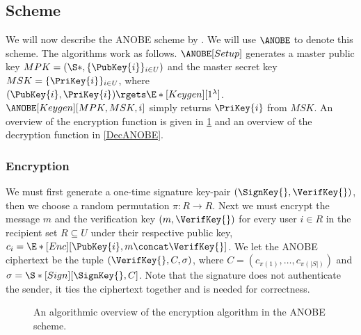 \subsection{ Scheme}\label{ANOBE}

We will now describe the \ac{ANOBE} scheme by \citet{ANOBE}.
We will use \(\ANOBE\) to denote this scheme.
The algorithms work as follows.
\(\ANOBE[Setup]\) generates a master public key \(MPK = (\S*, \{\PubKey{i}\}_{i\in
    U})\) and the master secret key \(MSK = \{\PriKey{i}\}_{i\in U}\), where 
\((\PubKey{i}, \PriKey{i})\rgets \E*[Keygen][1^\lambda]\).
\(\ANOBE[Keygen][MPK, MSK, i]\) simply returns \(\PriKey{i}\) from \(MSK\).
An overview of the encryption function is given in \cref{EncANOBE} and an 
overview of the decryption function in \cref{DecANOBE}.

\subsubsection{Encryption}

We must first generate a one-time signature key-pair \((\SignKey{}, 
  \VerifKey{})\), then we choose a random permutation \(\pi\colon R\to R\).
Next we must encrypt the message \(m\) and the verification key \((m, 
  \VerifKey{})\) for every user \(i\in R\) in the recipient set \(R\subseteq 
  U\) under their respective public key, \(c_{i} = \E*[Enc][\PubKey{i}, 
  m\concat \VerifKey{}]\).
We let the \ac{ANOBE} ciphertext be the tuple \((\VerifKey{}, C, \sigma)\), 
where
\(C = ( c_{\pi(1)}, \ldots, c_{\pi({|S|})})\) and
\(\sigma = \S*[Sign][\SignKey{}, C ]\).
Note that the signature does not authenticate the sender, it ties the 
ciphertext together and is needed for correctness.

\begin{frame}
  \begin{figure}
    \caption{%
      An algorithmic overview of the encryption algorithm in the \ac{ANOBE} 
      scheme.
    }\label{EncANOBE}
  \end{figure}
\end{frame}

